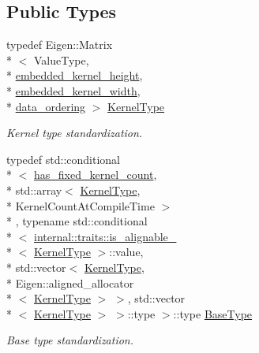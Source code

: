 \subsection*{Public Types}
\begin{DoxyCompactItemize}
\item 
typedef Eigen\-::\-Matrix\\*
$<$ Value\-Type, \\*
\hyperlink{structffnn_1_1layer_1_1convolution_1_1filter__options_a2dd55949dad6dd0d9b9c355f7a56ba02}{embedded\-\_\-kernel\-\_\-height}, \\*
\hyperlink{structffnn_1_1layer_1_1convolution_1_1filter__options_a2fc1d0f5a96641d9a04c8de7e6f1f0d1}{embedded\-\_\-kernel\-\_\-width}, \\*
\hyperlink{structffnn_1_1layer_1_1convolution_1_1filter__options_acc94f67d99e44b20f0ef04947eea68c2}{data\-\_\-ordering} $>$ \hyperlink{structffnn_1_1layer_1_1convolution_1_1filter__options_a4a15f803755f1947f64292cc4fd8553d}{Kernel\-Type}
\begin{DoxyCompactList}\small\item\em Kernel type standardization. \end{DoxyCompactList}\item 
typedef std\-::conditional\\*
$<$ \hyperlink{structffnn_1_1layer_1_1convolution_1_1filter__options_afbb18837e19377531a59cf8cf00e558f}{has\-\_\-fixed\-\_\-kernel\-\_\-count}, \\*
std\-::array$<$ \hyperlink{structffnn_1_1layer_1_1convolution_1_1filter__options_a4a15f803755f1947f64292cc4fd8553d}{Kernel\-Type}, \\*
Kernel\-Count\-At\-Compile\-Time $>$\\*
, typename std\-::conditional\\*
$<$ \hyperlink{structffnn_1_1internal_1_1traits_1_1is__alignable__128}{internal\-::traits\-::is\-\_\-alignable\-\_}\\*
$<$ \hyperlink{structffnn_1_1layer_1_1convolution_1_1filter__options_a4a15f803755f1947f64292cc4fd8553d}{Kernel\-Type} $>$\-::value, \\*
std\-::vector$<$ \hyperlink{structffnn_1_1layer_1_1convolution_1_1filter__options_a4a15f803755f1947f64292cc4fd8553d}{Kernel\-Type}, \\*
Eigen\-::aligned\-\_\-allocator\\*
$<$ \hyperlink{structffnn_1_1layer_1_1convolution_1_1filter__options_a4a15f803755f1947f64292cc4fd8553d}{Kernel\-Type} $>$ $>$, std\-::vector\\*
$<$ \hyperlink{structffnn_1_1layer_1_1convolution_1_1filter__options_a4a15f803755f1947f64292cc4fd8553d}{Kernel\-Type} $>$ $>$\-::type $>$\-::type \hyperlink{structffnn_1_1layer_1_1convolution_1_1filter__options_ab77319494179d8d17f91f128232e79cf}{Base\-Type}
\begin{DoxyCompactList}\small\item\em Base type standardization. \end{DoxyCompactList}\end{DoxyCompactItemize}
